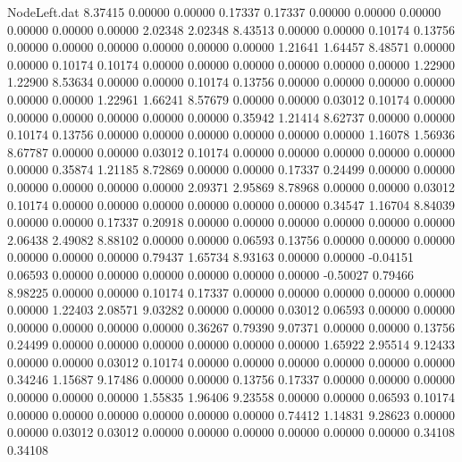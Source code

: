 \begin{filecontents}{NodeLeft.dat}
   8.37415    0.00000    0.00000     0.17337    0.17337    0.00000    0.00000    0.00000    0.00000    0.00000    0.00000    2.02348    2.02348
   8.43513    0.00000    0.00000     0.10174    0.13756    0.00000    0.00000    0.00000    0.00000    0.00000    0.00000    1.21641    1.64457
   8.48571    0.00000    0.00000     0.10174    0.10174    0.00000    0.00000    0.00000    0.00000    0.00000    0.00000    1.22900    1.22900
   8.53634    0.00000    0.00000     0.10174    0.13756    0.00000    0.00000    0.00000    0.00000    0.00000    0.00000    1.22961    1.66241
   8.57679    0.00000    0.00000     0.03012    0.10174    0.00000    0.00000    0.00000    0.00000    0.00000    0.00000    0.35942    1.21414
   8.62737    0.00000    0.00000     0.10174    0.13756    0.00000    0.00000    0.00000    0.00000    0.00000    0.00000    1.16078    1.56936
   8.67787    0.00000    0.00000     0.03012    0.10174    0.00000    0.00000    0.00000    0.00000    0.00000    0.00000    0.35874    1.21185
   8.72869    0.00000    0.00000     0.17337    0.24499    0.00000    0.00000    0.00000    0.00000    0.00000    0.00000    2.09371    2.95869
   8.78968    0.00000    0.00000     0.03012    0.10174    0.00000    0.00000    0.00000    0.00000    0.00000    0.00000    0.34547    1.16704
   8.84039    0.00000    0.00000     0.17337    0.20918    0.00000    0.00000    0.00000    0.00000    0.00000    0.00000    2.06438    2.49082
   8.88102    0.00000    0.00000     0.06593    0.13756    0.00000    0.00000    0.00000    0.00000    0.00000    0.00000    0.79437    1.65734
   8.93163    0.00000    0.00000    -0.04151    0.06593    0.00000    0.00000    0.00000    0.00000    0.00000    0.00000   -0.50027    0.79466
   8.98225    0.00000    0.00000     0.10174    0.17337    0.00000    0.00000    0.00000    0.00000    0.00000    0.00000    1.22403    2.08571
   9.03282    0.00000    0.00000     0.03012    0.06593    0.00000    0.00000    0.00000    0.00000    0.00000    0.00000    0.36267    0.79390
   9.07371    0.00000    0.00000     0.13756    0.24499    0.00000    0.00000    0.00000    0.00000    0.00000    0.00000    1.65922    2.95514
   9.12433    0.00000    0.00000     0.03012    0.10174    0.00000    0.00000    0.00000    0.00000    0.00000    0.00000    0.34246    1.15687
   9.17486    0.00000    0.00000     0.13756    0.17337    0.00000    0.00000    0.00000    0.00000    0.00000    0.00000    1.55835    1.96406
   9.23558    0.00000    0.00000     0.06593    0.10174    0.00000    0.00000    0.00000    0.00000    0.00000    0.00000    0.74412    1.14831
   9.28623    0.00000    0.00000     0.03012    0.03012    0.00000    0.00000    0.00000    0.00000    0.00000    0.00000    0.34108    0.34108

\end{filecontents}
